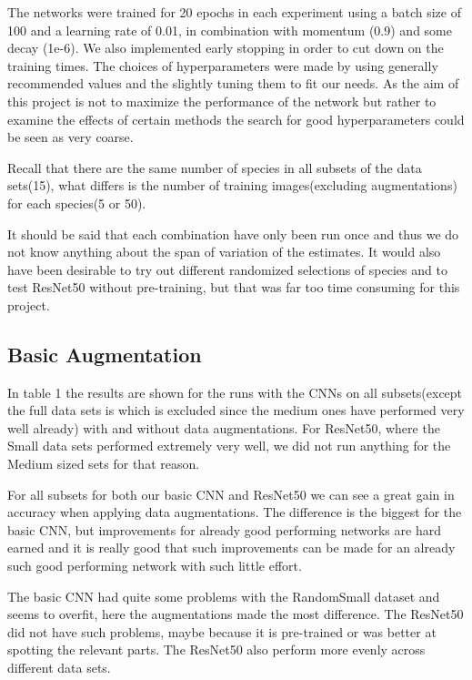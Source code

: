 \documentclass{article}
\begin{document}
The networks were trained for 20 epochs in each experiment using a batch size of 100 and a learning rate of 0.01, in combination with momentum (0.9) and some decay (1e-6). We also implemented early stopping in order to cut down on the training times. The choices of hyperparameters were made by using generally recommended values and the slightly tuning them to fit our needs. As the aim of this project is not to maximize the performance of the network but rather to examine the effects of certain methods the search for good hyperparameters could be seen as very coarse.

Recall that there are the same number of species in all subsets of the data sets(15), what differs is the number of training images(excluding augmentations) for each species(5 or 50).

It should be said that each combination have only been run once and thus we do not know anything about the span of variation of the estimates. It would also have been desirable to try out different randomized selections of species and to test ResNet50 without pre-training, but that was far too time consuming for this project.

\subsection{Basic Augmentation}
In table 1 the results are shown for the runs with the CNNs on all subsets(except the full data sets is which is excluded since the medium ones have performed very well already) with and without data augmentations. For ResNet50, where the Small data sets performed extremely very well, we did not run anything for the Medium sized sets for that reason. 

For all subsets for both our basic CNN and ResNet50 we can see a great gain in accuracy when applying data augmentations. The difference is the biggest for the basic CNN, but improvements for already good performing networks are hard earned and it is really good that such improvements can be made for an already such good performing network with such little effort. 

The basic CNN had quite some problems with the RandomSmall dataset and seems to overfit, here the augmentations made the most difference. The ResNet50 did not have such problems, maybe because it is pre-trained or was better at spotting the relevant parts. The ResNet50 also perform more evenly across different data sets. 
\end{document}
